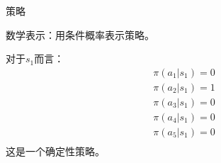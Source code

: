 \begin{frame}{策略}
\begin{center}
    \end{center}
    数学表示：用条件概率表示策略。

    对于$s_1$而言：
    \[
        \begin{aligned}
            \pi(a_1|s_1) = 0 \\
            \pi(a_2|s_1) = 1 \\
            \pi(a_3|s_1) = 0 \\
            \pi(a_4|s_1) = 0 \\
            \pi(a_5|s_1) = 0 \\
        \end{aligned}
    \]
    这是一个\alert{确定性}策略。
\end{frame}

